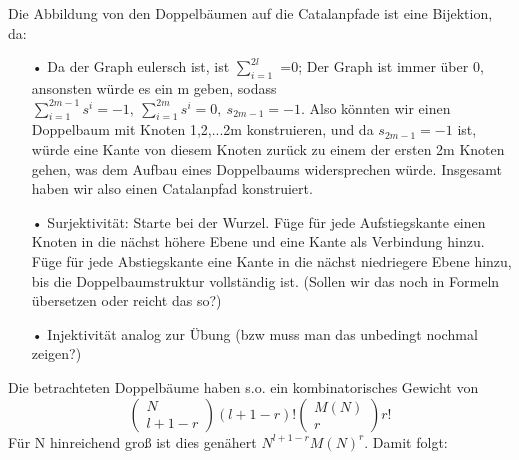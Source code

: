 \documentclass[a4paper, 11pt]{scrreprt}
\newcommand{\NN}{\mathbb{N}}
\begin{document}
Die Abbildung von den Doppelbäumen auf die Catalanpfade ist eine Bijektion, da:
\begin{itemize}
 \item[•]Da der Graph eulersch ist, ist $ \sum_{i=1}^{2l} $ =0; Der Graph ist immer über 0, ansonsten würde es ein m geben, sodass $ \sum_{i=1}^{2m-1}s^{i}=-1, ~\sum_{i=1}^{2m}s^{i}=0, ~ s_{2m-1}=-1  $. Also könnten wir einen Doppelbaum mit Knoten {1,2,...2m} konstruieren, und da $ s_{2m-1}=-1  $ ist, würde eine Kante von diesem Knoten zurück zu einem der ersten 2m Knoten gehen, was dem Aufbau eines Doppelbaums widersprechen würde. Insgesamt haben wir also einen Catalanpfad konstruiert. 
 \item[•] Surjektivität: Starte bei der Wurzel. Füge für jede Aufstiegskante einen Knoten in die nächst höhere Ebene und eine Kante als Verbindung hinzu. Füge für jede Abstiegskante eine Kante in die nächst niedriegere Ebene hinzu, bis die Doppelbaumstruktur vollständig ist. (Sollen wir das noch in Formeln übersetzen oder reicht das so?) 
\item[•] Injektivität analog zur Übung (bzw muss man das unbedingt nochmal zeigen?)\\
\end{itemize}
Die betrachteten Doppelbäume haben s.o. ein kombinatorisches Gewicht von 
	\begin{equation}
		\begin{pmatrix} N\\ l+1-r\end{pmatrix} (l+1-r)! \begin{pmatrix} M(N)\\r\end{pmatrix} r!
	\end{equation}
Für N hinreichend groß ist dies genähert \(N^{l+1-r}M(N)^r\). Damit folgt:
\end{document}
